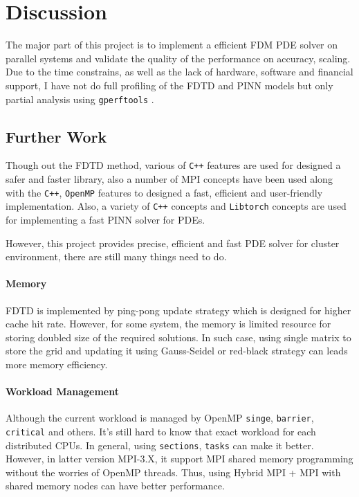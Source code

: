 \section{Discussion}
The major part of this project 
is to implement a efficient FDM PDE solver 
on parallel systems and validate the 
quality of the performance on accuracy, scaling.
Due to the time constrains, 
as well as the lack of hardware, software and financial support,
I have not do full profiling of the FDTD and PINN models but only 
partial analysis using \texttt{gperftools} \cite{gperftools}.


\subsection{Further Work}
Though out the FDTD method, 
various of \texttt{C++} features are used for designed a safer and faster library,
also a number of MPI concepts have been used along with the \texttt{C++}, \texttt{OpenMP} features
to designed a fast, efficient and user-friendly implementation.
Also, a variety of \texttt{C++} concepts and \texttt{Libtorch} concepts are used for implementing 
a fast PINN solver for PDEs.

However, this project provides precise, efficient and fast PDE solver for cluster environment,
there are still many things need to do.


\paragraph{Memory}
FDTD is implemented by ping-pong update strategy which is designed for higher cache hit rate.
However, for some system, the memory is limited resource for storing doubled size of the required solutions.
In such case, using single matrix to store the grid and updating it using 
Gauss-Seidel or red-black strategy can leads more memory efficiency.

\paragraph{Workload Management}
Although the current workload is managed by OpenMP \texttt{singe}, \texttt{barrier}, \texttt{critical} and others.
It's still hard to know that exact workload for each distributed CPUs.
In general, using \texttt{sections}, \texttt{tasks} can make it better.
However, in latter version MPI-3.X, it support MPI shared memory programming without 
the worries of OpenMP threads. 
Thus, using Hybrid MPI + MPI with shared memory nodes can have better performance.


